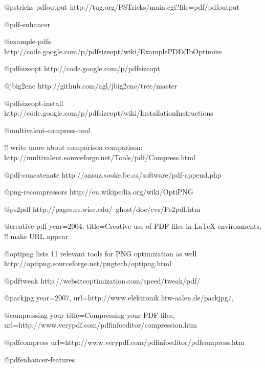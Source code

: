 \documentclass{ltugproc}
\begin{document}
@pstricks-pdfoutput{
http://tug.org/PSTricks/main.cgi?file=pdf/pdfoutput
}

@pdf-enhancer{
}

@example-pdfs{
http://code.google.com/p/pdfsizeopt/wiki/ExamplePDFsToOptimize
}

@pdfsizeopt{
http://code.google.com/p/pdfsizeopt
}

@jbig2enc{
http://github.com/agl/jbig2enc/tree/master
}

@pdfsizeopt-install{
http://code.google.com/p/pdfsizeopt/wiki/InstallationInstructions
}

@multivalent-compress-tool{
!! write more about comparison
comparison: http://multivalent.sourceforge.net/Tools/pdf/Compress.html

}

@pdf-concatenate{
http://ansuz.sooke.bc.ca/software/pdf-append.php
}

@png-recompressors{
http://en.wikipedia.org/wiki/OptiPNG
}

@ps2pdf{
http://pages.cs.wisc.edu/~ghost/doc/cvs/Ps2pdf.htm
}

@creative-pdf{
  year=2004,
  title={Creative use of PDF files in {\LaTeX} environments},
  !! make URL appear
}

@optipng{
  lists 11 relevant tools for PNG optimization as well
  http://optipng.sourceforge.net/pngtech/optipng.html
}

@pdftweak{
  http://websiteoptimization.com/speed/tweak/pdf/
}

@packjpg{
  year=2007,
  url={http://www.elektronik.htw-aalen.de/packjpg/},
}

@compressing-your{
  title={Compressing your PDF files},
  url={http://www.verypdf.com/pdfinfoeditor/compression.htm}
}

@pdfcompress{
  url={http://www.verypdf.com/pdfinfoeditor/pdfcompress.htm}
}

@pdfenhancer-features{
}
\end{document}
